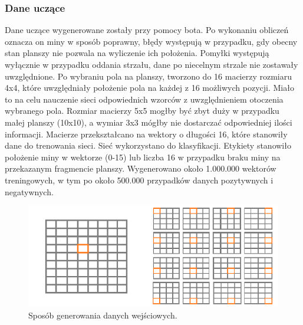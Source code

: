 \documentclass[letterpaper,12pt]{article}
\begin{document}
\subsubsection*{Dane uczące}
Dane uczące wygenerowane zostały przy pomocy bota. Po wykonaniu obliczeń oznacza on miny w sposób poprawny, błędy występują w przypadku, gdy obecny stan planszy
nie pozwala na wyliczenie ich położenia. Pomyłki występują wyłącznie w przypadku oddania strzału, dane po niecelnym strzale nie zostawały uwzględnione. Po wybraniu pola na planszy, 
tworzono do 16 macierzy rozmiaru 4x4, które uwzględniały położenie pola na każdej z 16 możliwych pozycji. Miało to na celu nauczenie sieci odpowiednich wzorców z uwzględnieniem otoczenia wybranego
pola. Rozmiar macierzy 5x5 mogłby być zbyt duży w przypadku małej planszy (10x10), a wymiar 3x3 mógłby nie dostarczać odpowiedniej ilości informacji. Macierze przekształcano na wektory o długości
16, które stanowiły dane do trenowania sieci. Sieć wykorzystano do klasyfikacji. Etykiety stanowiło położenie miny w wektorze (0-15) lub liczba 16 w przypadku braku miny na przekazanym fragmencie planszy.
Wygenerowano około 1.000.000 wektorów treningowych, w tym po około 500.000 przypadków danych pozytywnych i negatywnych.\\
\begin{figure}[H]
    \centering
    \includegraphics[scale=0.75]{generating.png}
    \caption{Sposób generowania danych wejściowych.}
\end{figure}
\end{document}
